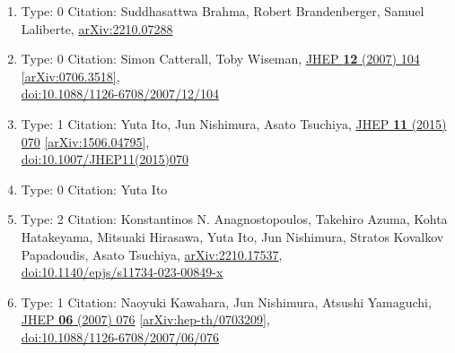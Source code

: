 \documentclass[a4paper,10pt]{article}
\begin{document}
\begin{enumerate}
\begin{enumerate}
  \item Type: 0 Citation: Suddhasattwa Brahma, Robert Brandenberger, Samuel Laliberte, \href{https://arxiv.org/abs/2210.07288}{arXiv:2210.07288}
  \item Type: 0 Citation: Simon Catterall, Toby Wiseman, \href{https://www.doi.org/10.1088/1126-6708/2007/12/104}{JHEP {\bf 12} (2007) 104}  \href{https://arxiv.org/abs/0706.3518}{[arXiv:0706.3518]},\\\href{https://www.doi.org/10.1088/1126-6708/2007/12/104}{doi:10.1088/1126-6708/2007/12/104}
  \item Type: 1 Citation: Yuta Ito, Jun Nishimura, Asato Tsuchiya, \href{https://www.doi.org/10.1007/JHEP11(2015)070}{JHEP {\bf 11} (2015) 070}  \href{https://arxiv.org/abs/1506.04795}{[arXiv:1506.04795]},\\\href{https://www.doi.org/10.1007/JHEP11(2015)070}{doi:10.1007/JHEP11(2015)070}
  \item Type: 0 Citation: Yuta Ito
  \item Type: 2 Citation: Konstantinos N. Anagnostopoulos, Takehiro Azuma, Kohta Hatakeyama, Mitsuaki Hirasawa, Yuta Ito, Jun Nishimura, Stratos Kovalkov Papadoudis, Asato Tsuchiya, \href{https://arxiv.org/abs/2210.17537}{arXiv:2210.17537},\\\href{https://www.doi.org/10.1140/epjs/s11734-023-00849-x}{doi:10.1140/epjs/s11734-023-00849-x}
  \item Type: 1 Citation: Naoyuki Kawahara, Jun Nishimura, Atsushi Yamaguchi, \href{https://www.doi.org/10.1088/1126-6708/2007/06/076}{JHEP {\bf 06} (2007) 076}  \href{https://arxiv.org/abs/hep-th/0703209}{[arXiv:hep-th/0703209]},\\\href{https://www.doi.org/10.1088/1126-6708/2007/06/076}{doi:10.1088/1126-6708/2007/06/076}

\end{enumerate}
\end{enumerate}
\end{document}
